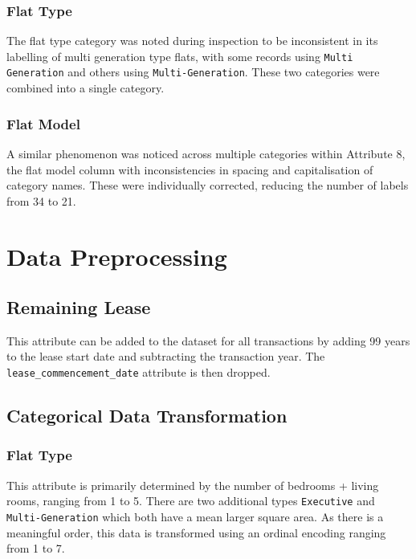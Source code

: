 \documentclass[[12pt,conference]{IEEEtran}
\begin{document}
\subsubsection{Flat Type}
The flat type category was noted during inspection to be inconsistent in its labelling of multi generation type flats, with some records using \texttt{Multi Generation} and others using \texttt{Multi-Generation}. 
These two categories were combined into a single category.

\subsubsection{Flat Model}
A similar phenomenon was noticed across multiple categories within Attribute 8, the flat model column with inconsistencies in spacing and capitalisation of category names. These were individually corrected, reducing the number of labels from 34 to 21. 


\section{Data Preprocessing}


\subsection{Remaining Lease}
This attribute can be added to the dataset for all transactions by adding 99 years to the lease start date and subtracting the transaction year. 
The \texttt{lease\_commencement\_date} attribute is then dropped. 

\subsection{Categorical Data Transformation}
\subsubsection{Flat Type}
This attribute is primarily determined by the number of bedrooms + living rooms, ranging from 1 to 5. There are two additional types \texttt{Executive} and \texttt{Multi-Generation} which both have a mean larger square area. As there is a meaningful order, this data is transformed using an ordinal encoding ranging from 1 to 7. 
\end{document}

